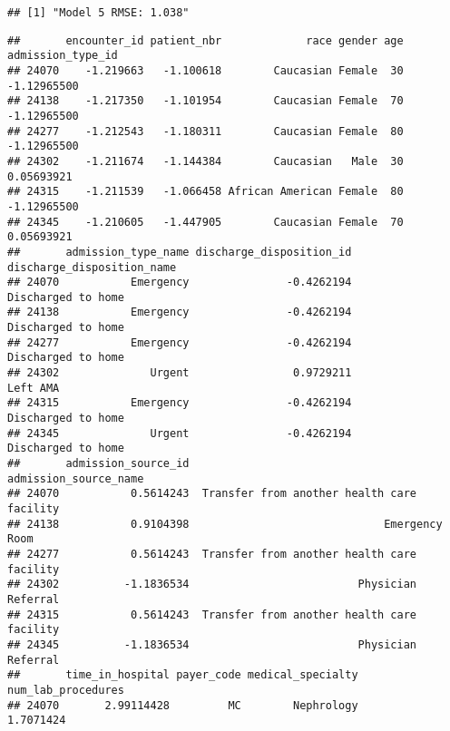 \documentclass[
]{article}
\newenvironment{Shaded}{\begin{snugshade}}{\end{snugshade}}
\newcommand{\AttributeTok}[1]{\textcolor[rgb]{0.13,0.29,0.53}{#1}}
\newcommand{\CommentTok}[1]{\textcolor[rgb]{0.56,0.35,0.01}{\textit{#1}}}
\newcommand{\FunctionTok}[1]{\textcolor[rgb]{0.13,0.29,0.53}{\textbf{#1}}}
\newcommand{\NormalTok}[1]{#1}
\newcommand{\OtherTok}[1]{\textcolor[rgb]{0.56,0.35,0.01}{#1}}
\newcommand{\SpecialCharTok}[1]{\textcolor[rgb]{0.81,0.36,0.00}{\textbf{#1}}}
\begin{document}
\begin{verbatim}
## [1] "Model 5 RMSE: 1.038"
\end{verbatim}

\begin{Shaded}
\end{Shaded}

\begin{verbatim}
##       encounter_id patient_nbr             race gender age admission_type_id
## 24070    -1.219663   -1.100618        Caucasian Female  30       -1.12965500
## 24138    -1.217350   -1.101954        Caucasian Female  70       -1.12965500
## 24277    -1.212543   -1.180311        Caucasian Female  80       -1.12965500
## 24302    -1.211674   -1.144384        Caucasian   Male  30        0.05693921
## 24315    -1.211539   -1.066458 African American Female  80       -1.12965500
## 24345    -1.210605   -1.447905        Caucasian Female  70        0.05693921
##       admission_type_name discharge_disposition_id discharge_disposition_name
## 24070           Emergency               -0.4262194         Discharged to home
## 24138           Emergency               -0.4262194         Discharged to home
## 24277           Emergency               -0.4262194         Discharged to home
## 24302              Urgent                0.9729211                   Left AMA
## 24315           Emergency               -0.4262194         Discharged to home
## 24345              Urgent               -0.4262194         Discharged to home
##       admission_source_id                       admission_source_name
## 24070           0.5614243  Transfer from another health care facility
## 24138           0.9104398                              Emergency Room
## 24277           0.5614243  Transfer from another health care facility
## 24302          -1.1836534                          Physician Referral
## 24315           0.5614243  Transfer from another health care facility
## 24345          -1.1836534                          Physician Referral
##       time_in_hospital payer_code medical_specialty num_lab_procedures
## 24070       2.99114428         MC        Nephrology          1.7071424

\end{verbatim}
\end{document}
